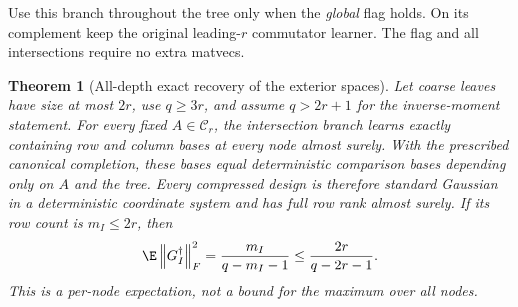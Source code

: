 \documentclass[11pt,oneside,openany,a4paper]{book}
\numberwithin{equation}{chapter}
\newtheorem{theorem}{Theorem}[chapter]
\theoremstyle{definition}
\theoremstyle{remark}
\newcommand{\F}[1]{\left\lVert#1\right\rVert_F}
\begin{document}
Use this branch throughout the tree only when the \emph{global} flag holds. On its complement keep the original leading-$r$ commutator learner. The flag and all intersections require no extra matvecs.

\begin{theorem}[All-depth exact recovery of the exterior spaces]\label{ports:thm:exactbranch}
Let coarse leaves have size at most $2r$, use $q\ge3r$, and assume $q>2r+1$ for the inverse-moment statement. For every fixed $A\in\mathcal C_r$, the intersection branch learns exactly containing row and column bases at every node almost surely. With the prescribed canonical completion, these bases equal deterministic comparison bases depending only on $A$ and the tree. Every compressed design is therefore standard Gaussian in a deterministic coordinate system and has full row rank almost surely. If its row count is $m_I\le2r$, then
\begin{equation}\label{ports:eq:branchinverse}
 \E\F{G_I^\dagger}^2=\frac{m_I}{q-m_I-1}
 \le\frac{2r}{q-2r-1}.
\end{equation}
This is a per-node expectation, not a bound for the maximum over all nodes.
\end{theorem}
\end{document}
